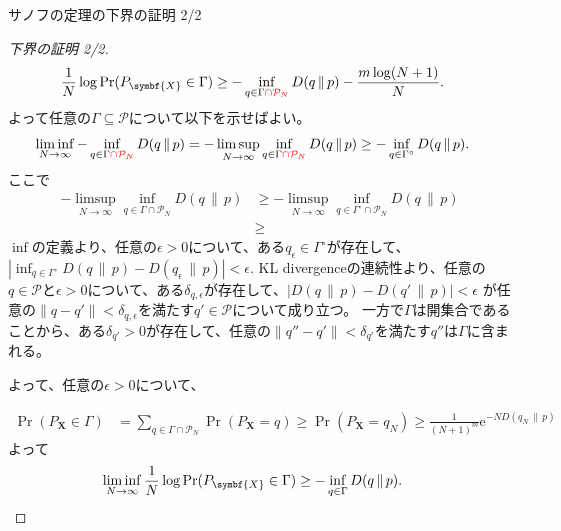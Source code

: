 \documentclass[lualatex,handout]{beamer}
\newcommand{\mycolor}[2]{%
  \begingroup
  \colorlet{currentcolor}{.}%
  \color{#1}#2%
  \color{currentcolor}%
  \endgroup
}
\newcommand{\emm}[1]{\mycolor{red}{#1}}
\newcommand\KL[2]{D(#1\,\|\,#2)}
\theoremstyle{definition}
\begin{document}
\begin{frame}{サノフの定理の下界の証明 2/2}
\footnotesize
\sanov
\begin{proof}[\small 下界の証明 2/2]
\vspace{-1.5em}
\begin{align*}
\frac1N\log\Pr(P_{\symbf{X}}\in\Gamma) &\ge -\inf_{q\in\Gamma\emm{\cap\mathcal{P}_N}}\KL{q}{p} - \frac{m\log(N+1)}{N}.
\end{align*}
よって任意の$\Gamma\subseteq\mathcal{P}$について以下を示せばよい。
\begin{align*}
 \liminf_{N\to\infty} -\inf_{q\in\Gamma\emm{\cap\mathcal{P}_N}}\KL{q}{p} &=
 -\limsup_{N\to\infty} \inf_{q\in\Gamma\emm{\cap\mathcal{P}_N}}\KL{q}{p} \ge -\inf_{q\in\Gamma^\circ}\KL{q}{p}.
\end{align*}
ここで
\begin{align*}
 -\limsup_{N\to\infty} \inf_{q\in\Gamma\cap\mathcal{P}_N}\KL{q}{p} &\ge
 -\limsup_{N\to\infty} \inf_{q\in\Gamma^\circ\cap\mathcal{P}_N}\KL{q}{p}\\
 &\ge
\end{align*}
$\inf$の定義より、任意の$\epsilon>0$について、ある$q_{\epsilon}\in\Gamma^\circ$が存在して、$|\inf_{q\in\Gamma^\circ}\KL{q}{p}-\KL{q_\epsilon}{p}|<\epsilon$.
KL divergenceの連続性より、任意の$q\in\mathcal{P}$と$\epsilon>0$について、ある$\delta_{q,\epsilon}$が存在して、$|\KL{q}{p}-\KL{q'}{p}|<\epsilon$ が任意の$\|q-q'\|<\delta_{q,\epsilon}$を満たす$q'\in\mathcal{P}$について成り立つ。
一方で$\Gamma$は開集合であることから、ある$\delta_{q'}>0$が存在して、任意の$\|q''-q'\|<\delta_{q'}$を満たす$q''$は$\Gamma$に含まれる。

よって、任意の$\epsilon>0$について、


\begin{align*}
\Pr(P_{\symbf{X}}\in\Gamma) &= \sum_{q\in\Gamma\cap\mathcal{P}_N} \Pr(P_{\symbf{X}} = q)
 \ge \Pr(P_{\symbf{X}}=q_N)
 \ge \frac1{(N+1)^m}\mathrm{e}^{-N\KL{q_N}{p}}
\end{align*}
よって
\begin{align*}
\liminf_{N\to\infty}\frac1N
\log\Pr(P_{\symbf{X}}\in\Gamma) &\ge -\inf_{q\in\Gamma}\KL{q}{p}.\qedhere
\end{align*}
\end{proof}
\end{frame}
\end{document}
